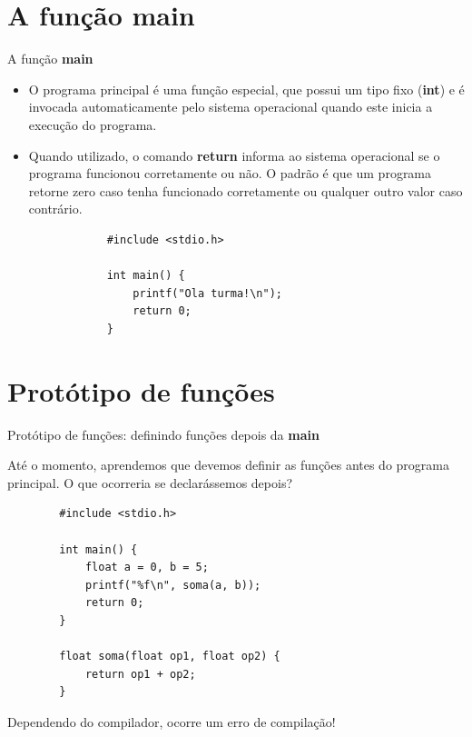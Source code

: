 \documentclass[handout]{beamer}
\begin{document}

\section {A função {\bf main}}

\begin{frame}[fragile]{A função {\bf main}}

    \begin{itemize}
        \item O programa principal é uma função especial, que possui um tipo fixo ({\bf int}) e é invocada automaticamente pelo sistema operacional quando este inicia a execução do programa.
        \item Quando utilizado, o comando {\bf return} informa ao sistema operacional se o programa funcionou corretamente ou não. O padrão é que um programa retorne zero caso tenha funcionado corretamente ou qualquer outro valor caso contrário.
        
        \begin{verbatim}
            #include <stdio.h>

            int main() {
                printf("Ola turma!\n");
                return 0;
            }
        \end{verbatim}
    \end{itemize}
\end{frame}


\section{Protótipo de funções}

\begin{frame}[fragile]{Protótipo de funções: definindo funções depois da {\bf main}}

    Até o momento, aprendemos que devemos definir as funções antes do programa principal.
    O que ocorreria se declarássemos depois?

    \begin{verbatim}
        #include <stdio.h>

        int main() {
            float a = 0, b = 5;
            printf("%f\n", soma(a, b));
            return 0;
        }

        float soma(float op1, float op2) {
            return op1 + op2;
        }
    \end{verbatim}

    \pause
    Dependendo do compilador, ocorre um erro de compilação!
\end{frame}
\end{document}
